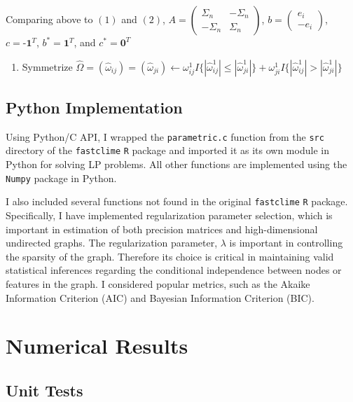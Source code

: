 \documentclass{article}
\def\gt{>}
\begin{document}
Comparing above to $(1)$ and $(2)$,
$A = \left( \begin{array}{cc} \Sigma_n & -\Sigma_n \\ -\Sigma_n & \Sigma_n \end{array} \right)$,
$b=\left( \begin{array}{c} e_i\\ -e_i\end{array} \right)$,
$c=\textbf{-1}^T$, $b^{*}=\textbf{1}^T$, and $c^{*}=\textbf{0}^T$

\begin{enumerate}
\def\labelenumi{\arabic{enumi}.}
\setcounter{enumi}{4}
\itemsep1pt\parskip0pt
\item
  Symmetrize
  $\hat{\Omega}=(\hat{\omega}_{ij})=(\hat{\omega}_{ji})\leftarrow\omega^1_{ij}I\{|\hat{\omega}_{ij}^1|\le|\hat{\omega}_{ji}^1|\}+\omega^1_{ji}I\{|\hat{\omega}_{ij}^1|\gt|\hat{\omega}_{ji}^1|\}$
\end{enumerate}

    \subsection{Python Implementation}\label{python-implementation}

    Using Python/C API, I wrapped the \texttt{parametric.c} function from
the \texttt{src} directory of the \texttt{fastclime} \texttt{R} package
and imported it as its own module in Python for solving LP problems. All
other functions are implemented using the \texttt{Numpy} package in
Python.

I also included several functions not found in the original
\texttt{fastclime} \texttt{R} package. Specifically, I have implemented
regularization parameter selection, which is important in estimation of
both precision matrices and high-dimensional undirected graphs. The
regularization parameter, $\lambda$ is important in controlling the
sparsity of the graph. Therefore its choice is critical in maintaining
valid statistical inferences regarding the conditional independence
between nodes or features in the graph. I considered popular metrics,
such as the Akaike Information Criterion (AIC) and Bayesian Information
Criterion (BIC).

    \section{Numerical Results}\label{numerical-results}

    \subsection{Unit Tests}\label{unit-tests}
\end{document}

